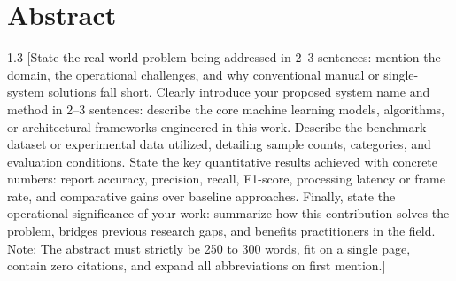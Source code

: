 \chapter*{Abstract}
\begin{spacing}{1.3}
[State the real-world problem being addressed in 2--3 sentences: mention the domain, the operational challenges, and why conventional manual or single-system solutions fall short. Clearly introduce your proposed system name and method in 2--3 sentences: describe the core machine learning models, algorithms, or architectural frameworks engineered in this work. Describe the benchmark dataset or experimental data utilized, detailing sample counts, categories, and evaluation conditions. State the key quantitative results achieved with concrete numbers: report accuracy, precision, recall, F1-score, processing latency or frame rate, and comparative gains over baseline approaches. Finally, state the operational significance of your work: summarize how this contribution solves the problem, bridges previous research gaps, and benefits practitioners in the field. Note: The abstract must strictly be 250 to 300 words, fit on a single page, contain zero citations, and expand all abbreviations on first mention.]
\end{spacing}
